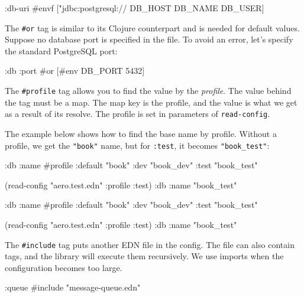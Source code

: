 \else

\begin{clojure}
{:db-uri #envf ["jdbc:postgresql://%
                DB_HOST DB_NAME DB_USER]}
\end{clojure}

\fi

The \verb|#or| tag is similar to its Clojure counterpart and is needed for default values. Suppose no database port is specified in the file. To avoid an error, let's specify the standard PostgreSQL port:

\begin{clojure}
{:db {:port #or [#env DB_PORT 5432]}}
\end{clojure}


The \verb|#profile| tag allows you to find the value by the \emph{profile}. The value behind the tag must be a map. The map key is the profile, and the value is what we get as a result of its resolve. The profile is set in parameters of \verb|read-config|.

The example below shows how to find the base name by profile. Without a profile, we get the \verb|"book"| name, but for \verb|:test|, it becomes \verb|"book_test"|:

\ifnarrow

\begin{clojure}
{:db
 {:name
  #profile {:default "book"
            :dev     "book_dev"
            :test    "book_test"}}}

(read-config "aero.test.edn"
  {:profile :test})
{:db {:name "book_test"}}
\end{clojure}

\else

\begin{clojure}
{:db {:name #profile {:default "book"
                      :dev     "book_dev"
                      :test    "book_test"}}}

(read-config "aero.test.edn" {:profile :test})
{:db {:name "book_test"}}
\end{clojure}

\fi

The \verb|#include| tag puts another EDN file in the config. The file can also contain tags, and the library will execute them recursively. We use imports when the configuration becomes too large.

\begin{clojure}
{:queue #include "message-queue.edn"}
\end{clojure}

